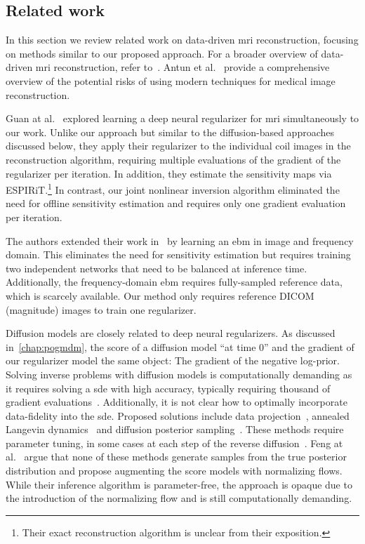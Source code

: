 \subsection{Related work}
\label{ssec:related work}
In this section we review related work on data-driven \gls{mri} reconstruction, focusing on methods similar to our proposed approach.
For a broader overview of data-driven \gls{mri} reconstruction, refer to~\cite{Zeng2021}.
Antun et al.~\cite{Antun2020} provide a comprehensive overview of the potential risks of using modern techniques for medical image reconstruction.

Guan at al.~\cite{Guan_energy_2022} explored learning a deep neural regularizer for \gls{mri} simultaneously to our work.
Unlike our approach but similar to the diffusion-based approaches discussed below, they apply their regularizer to the individual coil images in the reconstruction algorithm, requiring multiple evaluations of the gradient of the regularizer per iteration.
In addition, they estimate the sensitivity maps via ESPIRiT.\footnote{%
	Their exact reconstruction algorithm is unclear from their exposition.
}
In contrast, our joint nonlinear inversion algorithm eliminated the need for offline sensitivity estimation and requires only one gradient evaluation per iteration.

The authors extended their work in~\cite{tu_collaborative_2023} by learning an \gls{ebm} in image and frequency domain.
This eliminates the need for sensitivity estimation but requires training two independent networks that need to be balanced at inference time.
Additionally, the frequency-domain \gls{ebm} requires fully-sampled reference data, which is scarcely available.
Our method only requires reference DICOM (magnitude) images to train one regularizer.

Diffusion models are closely related to deep neural regularizers.
As discussed in~\cref{chap:pogmdm}, the score of a diffusion model \enquote{at time \num{0}} and the gradient of our regularizer model the same object:
The gradient of the negative log-prior.
Solving inverse problems with diffusion models is computationally demanding as it requires solving a \gls{sde} with high accuracy, typically requiring thousand of gradient evaluations~\cite{chung_scoremri_2022}.
Additionally, it is not clear how to optimally incorporate data-fidelity into the \gls{sde}.
Proposed solutions include data projection~\cite{song2022solving}, annealed Langevin dynamics~\cite{jalal_robust_comporessed_2021} and diffusion posterior sampling~\cite{chung2023diffusion}.
These methods require parameter tuning, in some cases at each step of the reverse diffusion~\cite{jalal_robust_comporessed_2021,chung2023diffusion}.
Feng at al.~\cite{feng2023scorebased} argue that none of these methods generate samples from the true posterior distribution and propose augmenting the score models with normalizing flows.
While their inference algorithm is parameter-free, the approach is opaque due to the introduction of the normalizing flow and is still computationally demanding.

